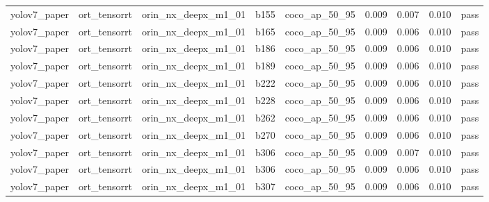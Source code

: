 \begin{table}[t]
\begin{tabular}{lrrrrrrrr}
yolov7\_paper & ort\_tensorrt & orin\_nx\_deepx\_m1\_01 & b155 & coco\_ap\_50\_95 & 0.009 & 0.007 & 0.010 & pass \\
yolov7\_paper & ort\_tensorrt & orin\_nx\_deepx\_m1\_01 & b165 & coco\_ap\_50\_95 & 0.009 & 0.006 & 0.010 & pass \\
yolov7\_paper & ort\_tensorrt & orin\_nx\_deepx\_m1\_01 & b186 & coco\_ap\_50\_95 & 0.009 & 0.006 & 0.010 & pass \\
yolov7\_paper & ort\_tensorrt & orin\_nx\_deepx\_m1\_01 & b189 & coco\_ap\_50\_95 & 0.009 & 0.006 & 0.010 & pass \\
yolov7\_paper & ort\_tensorrt & orin\_nx\_deepx\_m1\_01 & b222 & coco\_ap\_50\_95 & 0.009 & 0.006 & 0.010 & pass \\
yolov7\_paper & ort\_tensorrt & orin\_nx\_deepx\_m1\_01 & b228 & coco\_ap\_50\_95 & 0.009 & 0.006 & 0.010 & pass \\
yolov7\_paper & ort\_tensorrt & orin\_nx\_deepx\_m1\_01 & b262 & coco\_ap\_50\_95 & 0.009 & 0.006 & 0.010 & pass \\
yolov7\_paper & ort\_tensorrt & orin\_nx\_deepx\_m1\_01 & b270 & coco\_ap\_50\_95 & 0.009 & 0.006 & 0.010 & pass \\
yolov7\_paper & ort\_tensorrt & orin\_nx\_deepx\_m1\_01 & b306 & coco\_ap\_50\_95 & 0.009 & 0.007 & 0.010 & pass \\
yolov7\_paper & ort\_tensorrt & orin\_nx\_deepx\_m1\_01 & b306 & coco\_ap\_50\_95 & 0.009 & 0.006 & 0.010 & pass \\
yolov7\_paper & ort\_tensorrt & orin\_nx\_deepx\_m1\_01 & b307 & coco\_ap\_50\_95 & 0.009 & 0.006 & 0.010 & pass \\
\bottomrule
\end{tabular}
\end{table}
